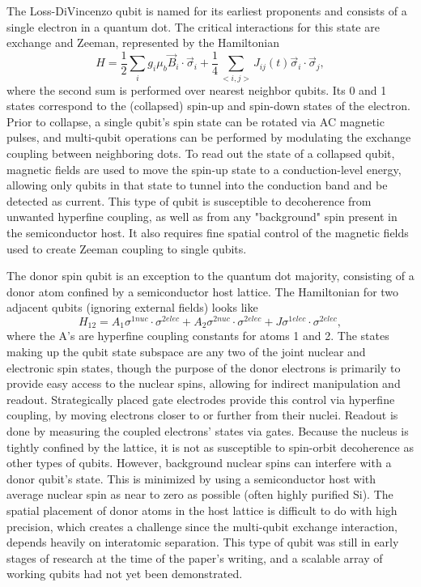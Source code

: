 \documentclass[aps,prl,twocolumn,superscriptaddress,groupedaddress]{revtex4}
\begin{document}
The Loss-DiVincenzo qubit is named for its earliest proponents and consists of a single electron in a quantum dot. The critical interactions for this state are exchange and Zeeman, represented by the Hamiltonian
\begin{equation}
H=\frac{1}{2}\sum_i g_i \mu_b \vec B_i \cdot \vec\sigma_i + \frac{1}{4}\sum_{<i,j>}J_{ij}(t)\vec\sigma_i \cdot \vec\sigma_j,
\end{equation}
where the second sum is performed over nearest neighbor qubits. Its 0 and 1 states correspond to the (collapsed) spin-up and spin-down states of the electron. Prior to collapse, a single qubit’s spin state can be rotated via AC magnetic pulses, and multi-qubit operations can be performed by modulating the exchange coupling between neighboring dots. To read out the state of a collapsed qubit, magnetic fields are used to move the spin-up state to a conduction-level energy, allowing only qubits in that state to tunnel into the conduction band and be detected as current. This type of qubit is susceptible to decoherence from unwanted hyperfine coupling, as well as from any "background" spin present in the semiconductor host. It also requires fine spatial control of the magnetic fields used to create Zeeman coupling to single qubits.

The donor spin qubit is an exception to the quantum dot majority, consisting of a donor atom confined by a semiconductor host lattice. The Hamiltonian for two adjacent qubits (ignoring external fields) looks like
\begin{equation}
H_{12}=A_1\sigma^{1nuc}\cdot\sigma^{2elec} + A_2\sigma^{2nuc}\cdot\sigma^{2elec} + J\sigma^{1elec}\cdot\sigma^{2elec},
\end{equation}
where the A's are hyperfine coupling constants for atoms 1 and 2. The states making up the qubit state subspace are any two of the joint nuclear and electronic spin states, though the purpose of the donor electrons is primarily to provide easy access to the nuclear spins, allowing for indirect manipulation and readout. Strategically placed gate electrodes provide this control via hyperfine coupling, by moving electrons closer to or further from their nuclei. Readout is done by measuring the coupled electrons’ states via gates. Because the nucleus is tightly confined by the lattice, it is not as susceptible to spin-orbit decoherence as other types of qubits. However, background nuclear spins can interfere with a donor qubit’s state. This is minimized by using a semiconductor host with average nuclear spin as near to zero as possible (often highly purified Si). The spatial placement of donor atoms in the host lattice is difficult to do with high precision, which creates a challenge since the multi-qubit exchange interaction, depends heavily on interatomic separation. This type of qubit was still in early stages of research at the time of the paper’s writing, and a scalable array of working qubits had not yet been demonstrated.
\end{document}
